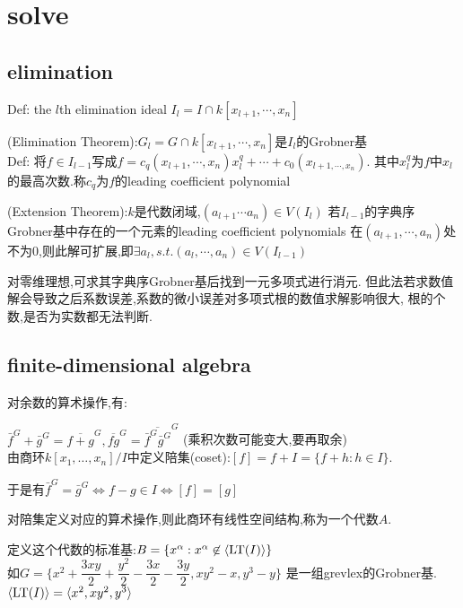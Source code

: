 \section{solve}

\subsection{elimination}
Def: the $ l$th elimination ideal $ I_l=I\cap k[x_{l+1},\cdots,x_n]$

(Elimination Theorem):$ G_l=G\cap k[x_{l+1},\cdots,x_n]$是$ I_l$的Grobner基
\\

Def: 将$ f \in I_{l-1}$写成$ f=c_q(x_{l+1},\cdots,x_n)x_l^q+\cdots+c_0(x_{l+1,\cdots,x_n})$.
其中$ x_l^q$为$ f$中$ x_l$的最高次数.称$ c_q$为$ f$的leading coefficient polynomial

(Extension Theorem):$ k$是代数闭域,$(a_{l+1}\cdots a_n)\in V(I_l)$
若$ I_{l-1}$的字典序Grobner基中存在的一个元素的leading coefficient polynomials
在$ (a_{l+1},\cdots,a_n)$处不为0,则此解可扩展,即$ \exists a_l,s.t.(a_l,\cdots,a_n)\in V(I_{l-1})$

对零维理想,可求其字典序Grobner基后找到一元多项式进行消元.
但此法若求数值解会导致之后系数误差,系数的微小误差对多项式根的数值求解影响很大,
根的个数,是否为实数都无法判断.


\subsection{finite-dimensional algebra}
对余数的算术操作,有:

$\bar{f}^G+\bar{g}^G= \overline{f+g}^G, \overline{fg}^G=\overline{\bar{f}^G\bar{g}^G}^G$
(乘积次数可能变大,要再取余)
\\

由商环$ k[x_1,\ldots,x_n]/I$中定义陪集(coset):$ [f]=f+I=\{f+h:h\in I\}$.

于是有$ \bar{f}^G=\bar{g}^G\Leftrightarrow f-g\in I\Leftrightarrow [f]=[g]$

对陪集定义对应的算术操作,则此商环有线性空间结构,称为一个代数$ A$.

定义这个代数的标准基:$ B=\{x^{\alpha}:x^{\alpha}\not \in \langle \operatorname{\tiny{LT}}(I) \rangle\}$
\\

如$ G=\{ x^2+\dfrac{3xy}{2}+\dfrac{y^2}{2}-\dfrac{3x}{2}-\dfrac{3y}{2},xy^2-x,y^3-y\}$
是一组grevlex的Grobner基. $ \langle \operatorname{\tiny{LT}}(I) \rangle=\langle x^2,xy^2,y^3 \rangle$ 

